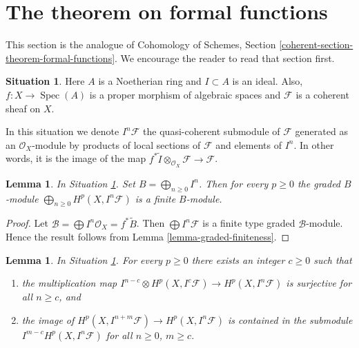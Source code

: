 \documentclass{stacks-project}
\theoremstyle{plain}
\newtheorem{lemma}[subsection]{Lemma}
\theoremstyle{definition}
\newtheorem{situation}[subsection]{Situation}
\theoremstyle{remark}
\numberwithin{equation}{subsection}
\def\Spec{\mathop{\mathrm{Spec}}}
\begin{document}
\section{The theorem on formal functions}
\label{section-theorem-formal-functions}

\noindent
This section is the analogue of
Cohomology of Schemes, Section \ref{coherent-section-theorem-formal-functions}.
We encourage the reader to read that section first.

\begin{situation}
\label{situation-formal-functions}
Here $A$ is a Noetherian ring and $I \subset A$ is an ideal.
Also, $f : X \to \Spec(A)$ is a proper morphism of algebraic spaces
and $\mathcal{F}$ is a coherent sheaf on $X$.
\end{situation}

\noindent
In this situation we denote $I^n\mathcal{F}$ the quasi-coherent
submodule of $\mathcal{F}$ generated as an $\mathcal{O}_X$-module
by products of local sections of $\mathcal{F}$ and elements of $I^n$.
In other words, it is the image of the map
$f^*\widetilde{I} \otimes_{\mathcal{O}_X} \mathcal{F} \to \mathcal{F}$.

\begin{lemma}
\label{lemma-cohomology-powers-ideal-times-F}
In Situation \ref{situation-formal-functions}.
Set $B = \bigoplus_{n \geq 0} I^n$.
Then for every $p \geq 0$ the graded $B$-module
$\bigoplus_{n \geq 0} H^p(X, I^n\mathcal{F})$ is
a finite $B$-module.
\end{lemma}

\begin{proof}
Let $\mathcal{B} = \bigoplus I^n\mathcal{O}_X = f^*\widetilde{B}$.
Then $\bigoplus I^n\mathcal{F}$ is a finite type
graded $\mathcal{B}$-module. Hence the result follows
from Lemma \ref{lemma-graded-finiteness}.
\end{proof}

\begin{lemma}
\label{lemma-cohomology-powers-ideal-application}
In Situation \ref{situation-formal-functions}.
For every $p \geq 0$ there exists an integer $c \geq 0$ such that
\begin{enumerate}
\item the multiplication map
$I^{n - c} \otimes H^p(X, I^c\mathcal{F}) \to H^p(X, I^n\mathcal{F})$
is surjective for all $n \geq c$, and
\item the image of $H^p(X, I^{n + m}\mathcal{F}) \to H^p(X, I^n\mathcal{F})$
is contained in the submodule $I^{m - c} H^p(X, I^n\mathcal{F})$
for all $n \geq 0$, $m \geq c$.
\end{enumerate}
\end{lemma}
\end{document}

